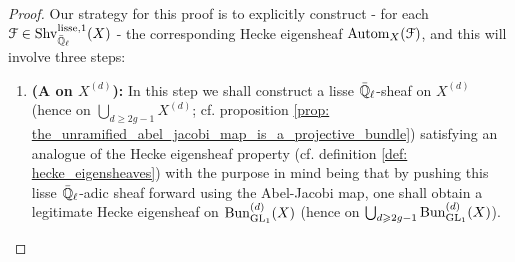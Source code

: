             \begin{proof}
                Our strategy for this proof is to explicitly construct - for each $\mathcal{F} \in \mathrm{Shv}_{\bar{\mathbb{Q}}_{\ell}}^{\mathrm{lisse}, 1}(X)$ - the corresponding Hecke eigensheaf $\mathrm{Autom}_X(\mathcal{F})$, and this will involve three steps:
                    \begin{enumerate}
                        \item \textbf{(A  on $X^{(d)}$):} In this step we shall construct a lisse $\bar{\mathbb{Q}}_{\ell}$-sheaf on $X^{(d)}$ (hence on $\bigcup_{d \geq 2g - 1} X^{(d)}$; cf. proposition \ref{prop: the_unramified_abel_jacobi_map_is_a_projective_bundle}) satisfying an analogue of the Hecke eigensheaf property (cf. definition \ref{def: hecke_eigensheaves}) with the purpose in mind being that by pushing this lisse $\bar{\mathbb{Q}}_{\ell}$-adic sheaf forward using the Abel-Jacobi map, one shall obtain a legitimate Hecke eigensheaf on $\mathrm{Bun}_{\operatorname{GL}_1}^{(d)}(X)$ (hence on $\bigcup_{d \geqslant 2g - 1} \mathrm{Bun}_{\operatorname{GL}_1}^{(d)}(X)$).
                        

\end{enumerate}
\end{proof}
